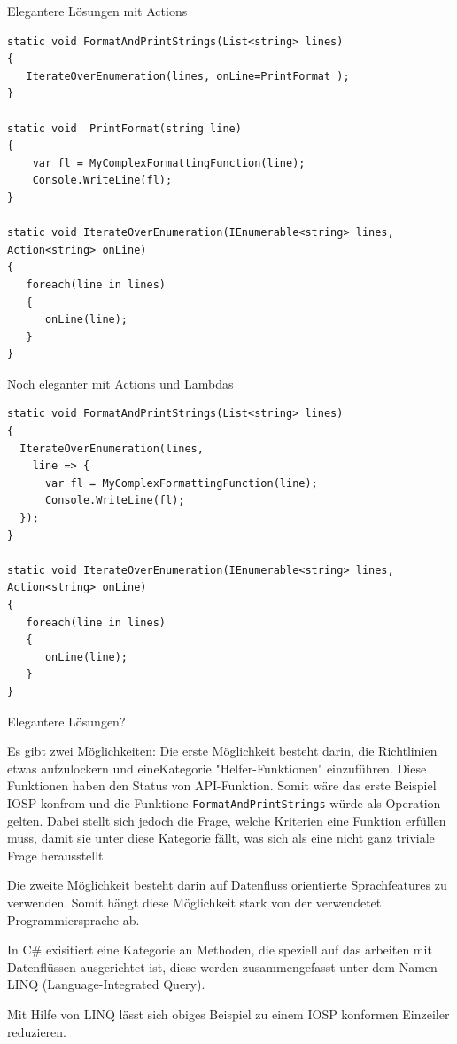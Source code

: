 \documentclass[11pt]{article}
\begin{document}
Elegantere Lösungen mit Actions

\begin{verbatim}
static void FormatAndPrintStrings(List<string> lines)
{
   IterateOverEnumeration(lines, onLine=PrintFormat );
}

static void  PrintFormat(string line)
{
    var fl = MyComplexFormattingFunction(line);
    Console.WriteLine(fl);
}

static void IterateOverEnumeration(IEnumerable<string> lines, Action<string> onLine)
{
   foreach(line in lines)
   {
      onLine(line);
   }
}
\end{verbatim}

Noch eleganter mit Actions und Lambdas

\begin{verbatim}
static void FormatAndPrintStrings(List<string> lines)
{
  IterateOverEnumeration(lines,
    line => {
      var fl = MyComplexFormattingFunction(line);
      Console.WriteLine(fl);
  });
}

static void IterateOverEnumeration(IEnumerable<string> lines, Action<string> onLine)
{
   foreach(line in lines)
   {
      onLine(line);
   }
}
\end{verbatim}


Elegantere Lösungen?

Es gibt zwei Möglichkeiten: Die erste Möglichkeit besteht darin, die Richtlinien etwas aufzulockern und eineKategorie "Helfer-Funktionen" einzuführen.
Diese Funktionen haben den Status von API-Funktion. Somit wäre das erste Beispiel IOSP konfrom und die Funktione \texttt{FormatAndPrintStrings}
würde als Operation gelten.
Dabei stellt sich jedoch die Frage, welche Kriterien eine Funktion erfüllen muss, damit sie unter diese Kategorie 
fällt, was sich als eine nicht ganz triviale Frage herausstellt.

Die zweite Möglichkeit besteht darin auf Datenfluss orientierte Sprachfeatures zu verwenden.
Somit hängt diese Möglichkeit stark von der verwendetet Programmiersprache ab.

In C\# exisitiert eine Kategorie an Methoden, die speziell auf das arbeiten mit Datenflüssen ausgerichtet ist, diese werden 
zusammengefasst unter dem Namen LINQ (Language-Integrated Query).

Mit Hilfe von LINQ lässt sich obiges Beispiel zu einem IOSP konformen Einzeiler reduzieren.
\end{document}
